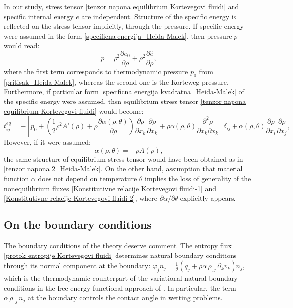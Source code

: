 \documentclass[a4paper,fleqn]{cas-sc}
\theoremstyle{definition}
\begin{document}
In our study, stress tensor \eqref{tenzor napona equilibrium Kortevegovi fluidi} and specific internal energy $e$ are independent. Structure of the specific energy is reflected on the stress tensor implicitly, through the pressure. If specific energy were assumed in the form \eqref{specificna energija_Heida-Malek}, then pressure $p$ would read: 
\begin{equation}
	p = \rho^{2} \frac{\partial e_{0}}{\partial \rho} 
	+ \rho^{2} \frac{\partial \hat{e}}{\partial \rho},
\end{equation}
where the first term corresponds to thermodynamic pressure $p_{0}$ from \eqref{pritisak_Heida-Malek}, whereas the second one is the Korteweg pressure. Furthermore, if particular form \eqref{specificna energija kvadratna_Heida-Malek} of the specific energy were assumed, then equilibrium stress tensor \eqref{tenzor napona equilibrium Kortevegovi fluidi} would become: 
\begin{equation*}
	t_{ij}^{eq} = - \left[ p_{0} + \left( \frac{1}{2} \rho^{2} A'(\rho) 
	+ \rho \dfrac{\partial \alpha(\rho,\theta)}{\partial\rho} \right)
	\dfrac{\partial\rho}{\partial x_k} \dfrac{\partial\rho}{\partial x_k} 
	+ \rho \alpha(\rho,\theta) \dfrac{\partial^2\rho}{\partial x_k\partial x_k} \right] \delta_{ij} 
	+ \alpha(\rho,\theta) \dfrac{\partial\rho}{\partial x_i} \dfrac{\partial\rho}{\partial x_j},
\end{equation*}
However, if it were assumed: 
\begin{equation}
	\alpha(\rho, \theta) = - \rho A(\rho), 
\end{equation}
the same structure of equilibrium stress tensor would have been obtained as in \eqref{tenzor napona 2_Heida-Malek}. On the other hand, assumption that material function $\alpha$ does not depend on temperature $\theta$ implies the loss of generality of the nonequilibrium fluxes \eqref{Konstitutivne relacije Kortevegovi fluidi-1} and \eqref{Konstitutivne relacije Kortevegovi fluidi-2}, where $\partial \alpha/\partial \theta$ explicitly appears. 

\subsection{On the boundary conditions} 

The boundary conditions of the theory deserve comment. The entropy flux \eqref{protok entropije Kortevegovi fluidi} determines natural boundary conditions through its normal component at the boundary: $\varphi_j n_j = \frac{1}{\theta}(q_j + \rho\alpha\,\rho_{,j}\,\partial_k v_k) n_j$, which is the thermodynamic counterpart of the variational natural boundary conditions in the free-energy functional approach of \cite{anderson1998diffuse}. In particular, the term $\alpha\,\rho_{,j}\,n_j$ at the boundary controls the contact angle in wetting problems. 
\end{document}
